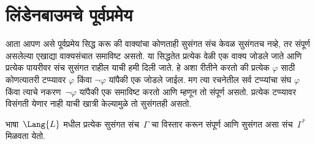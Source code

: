 \section{लिंडेनबाउमचे पूर्वप्रमेय}\label{fol:com:lin:sec}

\begin{explain}
आता आपण असे पूर्वप्रमेय सिद्ध करू की वाक्यांचा कोणताही सुसंगत
संच केवळ सुसंगतच नव्हे, तर संपूर्ण असलेल्या एखाद्या वाक्यसंचात
समाविष्ट असतो. या सिद्धतेत प्रत्येक वेळी एक वाक्य जोडले जाते
आणि प्रत्येक पायरीवर संच सुसंगत राहील याची हमी दिली जाते. हे अशा रीतीने
करतो की प्रत्येक $\varphi$ साठी कोणत्यातरी टप्प्यावर $\varphi$ किंवा $\lnot
\varphi$ यांपैकी एक जोडले जाईल. मग त्या रचनेतील सर्व टप्प्यांचा संघ $\varphi$
किंवा त्याचे नकरण~$\lnot \varphi$ यांपैकी एक समाविष्ट करतो आणि म्हणून तो
संपूर्ण असतो. प्रत्येक टप्प्यावर विसंगती येणार नाही याची खात्री केल्यामुळे
तो सुसंगतही असतो.
\end{explain}

\begin{lem}[लिंडेनबाउमचे पूर्वप्रमेय]
\label{fol:com:lin:lem:lindenbaum} भाषा~$\Lang{L}$ मधील प्रत्येक सुसंगत
संच~$\Gamma$ चा विस्तार करून संपूर्ण आणि सुसंगत असा
संच~$\Gamma^*$ मिळवता येतो.
\end{lem}

